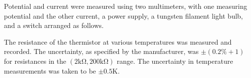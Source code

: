\begin{paper}
	\begin{paperwhere}
	\end{paperwhere}

	Potential and current were measured using two multimeters, with one measuring potential and the other current, a power supply, a tungsten filament light bulb, and a switch arranged as follows. 
	
	

	The resistance of the thermistor at various temperatures was measured and recorded. The uncertainty, as specified by the manufacturer, was $ \pm (0.2\% + 1) $ for resistances in the $ (2 \si{\kilo\ohm}, 200 \si{\kilo\ohm}) $ range. The uncertainty in temperature measurements was taken to be $ \pm 0.5 \si{\kelvin} $.
	

\end{paper}
